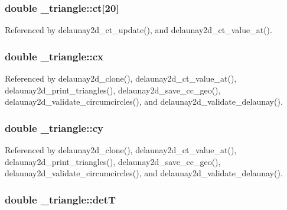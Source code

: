 \subsubsection[{\texorpdfstring{ct}{ct}}]{\setlength{\rightskip}{0pt plus 5cm}double \+\_\+triangle\+::ct\mbox{[}20\mbox{]}}\hypertarget{struct__triangle_a10d65266a21950269603b53b9ecdc533}{}\label{struct__triangle_a10d65266a21950269603b53b9ecdc533}


Referenced by delaunay2d\+\_\+ct\+\_\+update(), and delaunay2d\+\_\+ct\+\_\+value\+\_\+at().

\subsubsection[{\texorpdfstring{cx}{cx}}]{\setlength{\rightskip}{0pt plus 5cm}double \+\_\+triangle\+::cx}\hypertarget{struct__triangle_a615e8f4d7d77ae63b3021b3fed607e9b}{}\label{struct__triangle_a615e8f4d7d77ae63b3021b3fed607e9b}


Referenced by delaunay2d\+\_\+clone(), delaunay2d\+\_\+ct\+\_\+value\+\_\+at(), delaunay2d\+\_\+print\+\_\+triangles(), delaunay2d\+\_\+save\+\_\+cc\+\_\+geo(), delaunay2d\+\_\+validate\+\_\+circumcircles(), and delaunay2d\+\_\+validate\+\_\+delaunay().

\subsubsection[{\texorpdfstring{cy}{cy}}]{\setlength{\rightskip}{0pt plus 5cm}double \+\_\+triangle\+::cy}\hypertarget{struct__triangle_a3bbbdfc71a9c2956babf06fd57e7e8c1}{}\label{struct__triangle_a3bbbdfc71a9c2956babf06fd57e7e8c1}


Referenced by delaunay2d\+\_\+clone(), delaunay2d\+\_\+ct\+\_\+value\+\_\+at(), delaunay2d\+\_\+print\+\_\+triangles(), delaunay2d\+\_\+save\+\_\+cc\+\_\+geo(), delaunay2d\+\_\+validate\+\_\+circumcircles(), and delaunay2d\+\_\+validate\+\_\+delaunay().

\subsubsection[{\texorpdfstring{detT}{detT}}]{\setlength{\rightskip}{0pt plus 5cm}double \+\_\+triangle\+::detT}\hypertarget{struct__triangle_ab1c37cf46e2e159fce60bf11e03e767a}{}\label{struct__triangle_ab1c37cf46e2e159fce60bf11e03e767a}


